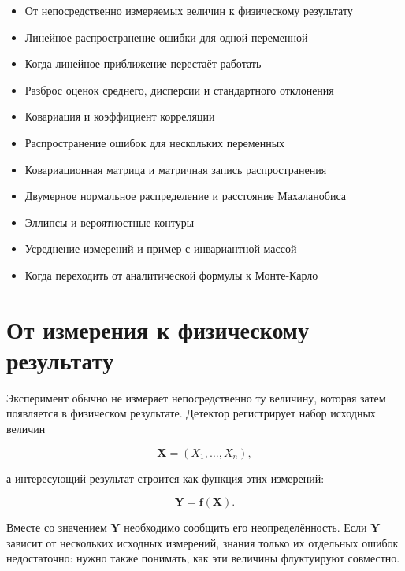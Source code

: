 \documentclass[
  russian,
  12pt,
  a4paper,
  a4paper,
  openany]{scrbook}
\providecommand{\tightlist}{%
  \setlength{\itemsep}{0pt}\setlength{\parskip}{0pt}}
\begin{document}
\begin{itemize}
\tightlist
\item
  От непосредственно измеряемых величин к физическому результату
\item
  Линейное распространение ошибки для одной переменной
\item
  Когда линейное приближение перестаёт работать
\item
  Разброс оценок среднего, дисперсии и стандартного отклонения
\item
  Ковариация и коэффициент корреляции
\item
  Распространение ошибок для нескольких переменных
\item
  Ковариационная матрица и матричная запись распространения
\item
  Двумерное нормальное распределение и расстояние Махаланобиса
\item
  Эллипсы и вероятностные контуры
\item
  Усреднение измерений и пример с инвариантной массой
\item
  Когда переходить от аналитической формулы к Монте-Карло
\end{itemize}

\section{От измерения к физическому
результату}\label{ux43eux442-ux438ux437ux43cux435ux440ux435ux43dux438ux44f-ux43a-ux444ux438ux437ux438ux447ux435ux441ux43aux43eux43cux443-ux440ux435ux437ux443ux43bux44cux442ux430ux442ux443}

Эксперимент обычно не измеряет непосредственно ту величину, которая
затем появляется в физическом результате. Детектор регистрирует набор
исходных величин

\[
\mathbf X=(X_1,\ldots,X_n),
\]

а интересующий результат строится как функция этих измерений:

\[
\mathbf Y=\mathbf f(\mathbf X).
\]

Вместе со значением \(\mathbf Y\) необходимо сообщить его
неопределённость. Если \(\mathbf Y\) зависит от нескольких исходных
измерений, знания только их отдельных ошибок недостаточно: нужно также
понимать, как эти величины флуктуируют совместно.
\end{document}
